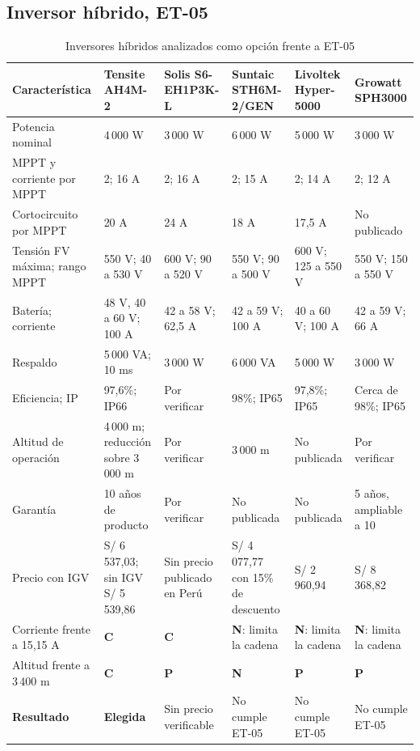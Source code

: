 \subsection{Inversor híbrido, ET-05}
\begin{table}[htbp]\formatofichas
\caption{Inversores híbridos analizados como opción frente a ET-05}\label{tab:comp_inversor}
\begin{tabularx}{\linewidth}{@{}>{\raggedright\arraybackslash}p{2.25cm}YYYYY@{}}
\toprule
\textbf{Característica} & \textbf{Tensite AH4M-2} & \textbf{Solis S6-EH1P3K-L} & \textbf{Suntaic STH6M-2/GEN} & \textbf{Livoltek Hyper-5000} & \textbf{Growatt SPH3000}\\\midrule
Potencia nominal & 4\,000 W & 3\,000 W & 6\,000 W & 5\,000 W & 3\,000 W\\
MPPT y corriente por MPPT & 2; 16 A & 2; 16 A & 2; 15 A & 2; 14 A & 2; 12 A\\
Cortocircuito por MPPT & 20 A & 24 A & 18 A & 17,5 A & No publicado\\
Tensión FV máxima; rango MPPT & 550 V; 40 a 530 V & 600 V; 90 a 520 V & 550 V; 90 a 500 V & 600 V; 125 a 550 V & 550 V; 150 a 550 V\\
Batería; corriente & 48 V, 40 a 60 V; 100 A & 42 a 58 V; 62,5 A & 42 a 59 V; 100 A & 40 a 60 V; 100 A & 42 a 59 V; 66 A\\
Respaldo & 5\,000 VA; 10 ms & 3\,000 W & 6\,000 VA & 5\,000 W & 3\,000 W\\
Eficiencia; IP & 97,6\%; IP66 & Por verificar & 98\%; IP65 & 97,8\%; IP65 & Cerca de 98\%; IP65\\
Altitud de operación & 4\,000 m; reducción sobre 3\,000 m & Por verificar & 3\,000 m & No publicada & Por verificar\\
Garantía & 10 años de producto & Por verificar & No publicada & No publicada & 5 años, ampliable a 10\\
Precio con IGV & S/ 6\,537,03; sin IGV S/ 5\,539,86 & Sin precio publicado en Perú & S/ 4\,077,77 con 15\% de descuento & S/ 2\,960,94 & S/ 8\,368,82\\\midrule
Corriente frente a 15,15 A & \textbf{C} & \textbf{C} & \textbf{N}: limita la cadena & \textbf{N}: limita la cadena & \textbf{N}: limita la cadena\\
Altitud frente a 3\,400 m & \textbf{C} & \textbf{P} & \textbf{N} & \textbf{P} & \textbf{P}\\
\textbf{Resultado} & \textbf{Elegida} & Sin precio verificable & No cumple ET-05 & No cumple ET-05 & No cumple ET-05\\
\bottomrule
\end{tabularx}
\end{table}
